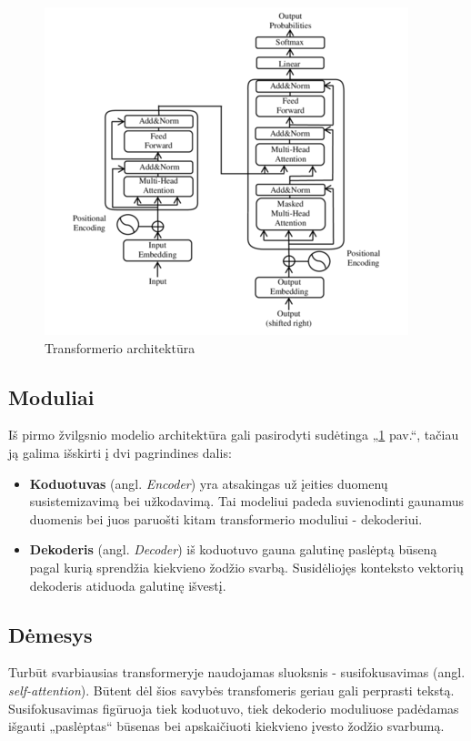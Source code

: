 \documentclass[conference]{IEEEtran}
\begin{document}
\begin{figure}
    \centering
    \includegraphics[scale=0.65]{transformer.png}
    \caption{Transformerio architektūra}
    \label{pav:1}
\end{figure}

\subsection{Moduliai}
Iš pirmo žvilgsnio modelio architektūra gali pasirodyti sudėtinga „\ref{pav:1} pav.“, tačiau ją galima išskirti į dvi pagrindines dalis:
\begin{itemize}
  \item \textbf{Koduotuvas} (angl. \textit{Encoder}) yra atsakingas už įeities duomenų susistemizavimą bei užkodavimą. Tai modeliui padeda suvienodinti gaunamus duomenis bei juos paruošti kitam transformerio moduliui - dekoderiui.
  \item \textbf{Dekoderis} (angl. \textit{Decoder}) iš koduotuvo gauna galutinę paslėptą būseną pagal kurią sprendžia kiekvieno žodžio svarbą. Susidėliojęs konteksto vektorių dekoderis atiduoda galutinę išvestį.
\end{itemize}
\subsection{Dėmesys}
Turbūt svarbiausias transformeryje naudojamas sluoksnis - susifokusavimas (angl. \textit{self-attention}). Būtent dėl šios savybės transfomeris geriau gali perprasti tekstą. Susifokusavimas figūruoja tiek koduotuvo, tiek dekoderio moduliuose padėdamas išgauti „paslėptas“ būsenas bei apskaičiuoti kiekvieno įvesto žodžio svarbumą. 
\end{document}
